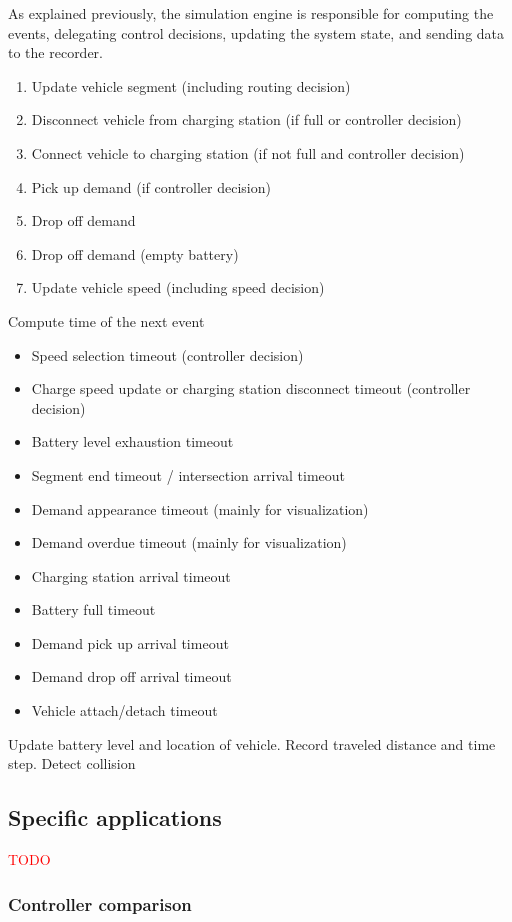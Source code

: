 \documentclass[10pt,twocolumn]{article}
\begin{document}
As explained previously, the simulation engine is responsible for computing the events, delegating control decisions, updating the system state, and sending data to the recorder.
\begin{enumerate}
    \item Update vehicle segment (including routing decision)
    \item Disconnect vehicle from charging station (if full or controller decision)
    \item Connect vehicle to charging station (if not full and controller decision)
    \item Pick up demand (if controller decision)
    \item Drop off demand
    \item Drop off demand (empty battery)
    \item Update vehicle speed (including speed decision)
\end{enumerate}
Compute time of the next event
\begin{itemize}
    \item Speed selection timeout (controller decision)
    \item Charge speed update or charging station disconnect timeout (controller decision)
    \item Battery level exhaustion timeout
    \item Segment end timeout / intersection arrival timeout
    \item Demand appearance timeout (mainly for visualization)
    \item Demand overdue timeout (mainly for visualization)
    \item Charging station arrival timeout
    \item Battery full timeout
    \item Demand pick up arrival timeout
    \item Demand drop off arrival timeout
    \item Vehicle attach/detach timeout
\end{itemize}
Update battery level and location of vehicle.
Record traveled distance and time step.
Detect collision

\subsection{Specific applications}
\label{sec:application}

\textcolor{red}{TODO}

\subsubsection{Controller comparison}
\label{sec:controller-comparison}
\end{document}
